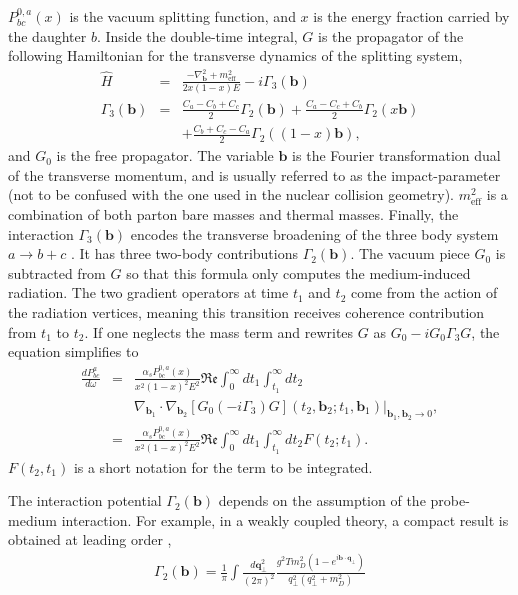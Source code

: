 $P^{0,a}_{bc}(x)$ is the vacuum splitting function, and $x$ is the energy fraction carried by the daughter $b$.
Inside the double-time integral, $G$ is the propagator of the following Hamiltonian for the transverse dynamics of the splitting system,
\begin{eqnarray}
\hat{H} &=& \frac{-\nabla^2_{\mathbf{b}} + m^2_\textrm{eff}}{2x(1-x)E} - i \Gamma_3(\mathbf{b})\\
\Gamma_3(\mathbf{b}) &=& \frac{C_a-C_b+C_c}{2}\Gamma_2(\mathbf{b}) + \frac{C_a-C_c+C_b}{2}\Gamma_2(x\mathbf{b}) \\\nonumber
&&+ \frac{C_b+C_c-C_a}{2}\Gamma_2((1-x)\mathbf{b}),
\end{eqnarray}
and $G_0$ is the free propagator. 
The variable $\mathbf{b}$ is the Fourier transformation dual of the transverse momentum, and is usually referred to as the impact-parameter (not to be confused with the one used in the nuclear collision geometry).
$m^2_\textrm{eff}$ is a combination of both parton bare masses and thermal masses.
Finally, the interaction $\Gamma_3(\mathbf{b})$ encodes the transverse broadening of the three body system $a\rightarrow b+c$ \cite{Zakharov:1997uu}.
It has three two-body contributions $\Gamma_2(\mathbf{b})$.
The vacuum piece $G_0$ is subtracted from $G$ so that this formula only computes the medium-induced radiation.
The two gradient operators at time $t_1$ and $t_2$ come from the action of the radiation vertices, meaning this transition receives coherence contribution from $t_1$ to $t_2$.
If one neglects the mass term and rewrites $G$ as $G_0 -i G_0\Gamma_3 G$, the equation simplifies to 
\begin{eqnarray}
\nonumber
\frac{dP^{a}_{bc}}{d\omega} &=& \frac{\alpha_s P^{0,a}_{bc}(x)}{x^2(1-x)^2 E^2}\mathfrak{Re}\int_0^\infty dt_1 \int_{t_1}^{\infty} dt_2\\ &&\nabla_{\mathbf{b}_1} \cdot\nabla_{\mathbf{b}_2} [G_0(-i\Gamma_3) G](t_2, \mathbf{b}_2;t_1, \mathbf{b}_1)|_{\mathbf{b}_1, \mathbf{b}_2 \rightarrow 0},\\
&=& \frac{\alpha_s P^{0,a}_{bc}(x)}{x^2(1-x)^2 E^2}\mathfrak{Re}\int_0^\infty dt_1 \int_{t_1}^{\infty} dt_2 F(t_2; t_1).
\end{eqnarray}
$F(t_2, t_1)$ is a short notation for the term to be integrated.

The interaction potential $\Gamma_2(\mathbf{b})$ depends on the assumption of the probe-medium interaction.
For example, in a weakly coupled theory, a compact result is obtained at leading order \cite{Aurenche:2002pd},
\begin{eqnarray}
\Gamma_2(\mathbf{b}) = \frac{1}{\pi}\int \frac{d\mathbf{q}_\perp^2}{(2\pi)^2} \frac{g^2 T m_D^2 (1-e^{i\mathbf{b}\cdot\mathbf{q_\perp}})}{q_\perp^2(q_\perp^2+m_D^2)}
\end{eqnarray}

